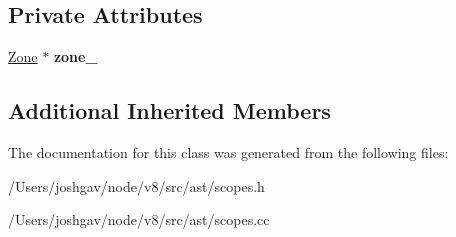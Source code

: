 \subsection*{Private Attributes}
\begin{DoxyCompactItemize}
\item 
\hyperlink{classv8_1_1internal_1_1_zone}{Zone} $\ast$ {\bfseries zone\+\_\+}\hypertarget{classv8_1_1internal_1_1_sloppy_block_function_map_a4eabcbde03636fee78f6818750015369}{}\label{classv8_1_1internal_1_1_sloppy_block_function_map_a4eabcbde03636fee78f6818750015369}

\end{DoxyCompactItemize}
\subsection*{Additional Inherited Members}


The documentation for this class was generated from the following files\+:\begin{DoxyCompactItemize}
\item 
/\+Users/joshgav/node/v8/src/ast/scopes.\+h\item 
/\+Users/joshgav/node/v8/src/ast/scopes.\+cc\end{DoxyCompactItemize}
